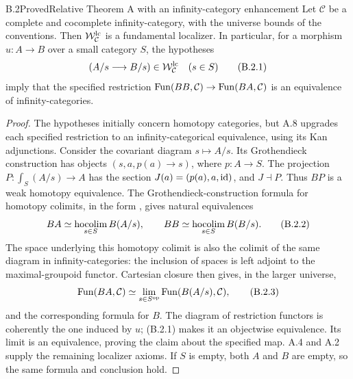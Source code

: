 \begin{claim}{B.2}{Proved}{Relative Theorem A with an infinity-category enhancement}
Let $\mathcal C$ be a complete and cocomplete infinity-category,
with the universe bounds of the conventions. Then
$\mathcal W^{\mathrm{lc}}_{\mathcal C}$ is a fundamental localizer.
In particular, for a morphism $u:A\to B$ over a small category
$S$, the hypotheses
\[
 (A/s\longrightarrow B/s)\in\mathcal W^{\mathrm{lc}}_{\mathcal C}
 \quad(s\in S)
 \tag{B.2.1}
\]
imply that the specified restriction
$\operatorname{Fun}(BB,\mathcal C)\to\operatorname{Fun}(BA,\mathcal C)$ is an
equivalence of infinity-categories.
\end{claim}
\begin{proof}
The hypotheses initially concern homotopy categories, but A.8
upgrades each specified restriction to an infinity-categorical
equivalence, using its Kan adjunctions. Consider the covariant
diagram $s\mapsto A/s$. Its Grothendieck construction has objects
$(s,a,p(a)\to s)$, where $p:A\to S$. The projection
$P:\int_S(A/s)\to A$ has the section
$J(a)=(p(a),a,\mathrm{id})$, and $J\dashv P$. Thus $BP$ is a weak
homotopy equivalence. The Grothendieck-construction formula for
homotopy colimits, in the form
\citet[Theorem~1.13 and Remark~1.14]{Cisinski2008}, gives natural
equivalences
\[
 BA\simeq\operatorname*{hocolim}_{s\in S}B(A/s),\qquad
 BB\simeq\operatorname*{hocolim}_{s\in S}B(B/s).
 \tag{B.2.2}
\]
The space underlying this homotopy colimit is also the colimit of
the same diagram in infinity-categories: the inclusion of spaces
is left adjoint to the maximal-groupoid functor. Cartesian closure
then gives, in the larger universe,
\[
 \operatorname{Fun}(BA,\mathcal C)\simeq
 \lim_{s\in S^{\mathrm{op}}}\operatorname{Fun}(B(A/s),\mathcal C),
 \tag{B.2.3}
\]
and the corresponding formula for $B$. The diagram of restriction
functors is coherently the one induced by $u$; (B.2.1) makes it an
objectwise equivalence. Its limit is an equivalence, proving the
claim about the specified map. A.4 and A.2 supply the remaining
localizer axioms. If $S$ is empty, both $A$ and $B$ are empty,
so the same formula and conclusion hold.
\end{proof}






